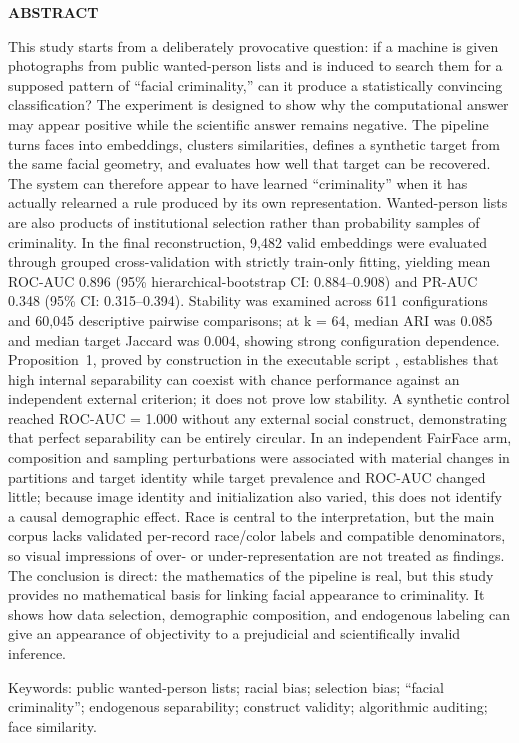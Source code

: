 \documentclass[12pt,oneside,a4paper,openany,brazil]{abntex2}
\newcommand{\frontheading}[1]{\par\noindent\textbf{#1}\par\vspace{3pt}}
\begin{document}
\begingroup\SingleSpacing\setlength{\parindent}{0pt}\fontsize{10.5}{13.2}\selectfont
\frontheading{ABSTRACT}
This study starts from a deliberately provocative question: if a machine is given photographs from public wanted-person lists and is induced to search them for a supposed pattern of ``facial criminality,'' can it produce a statistically convincing classification? The experiment is designed to show why the computational answer may appear positive while the scientific answer remains negative. The pipeline turns faces into embeddings, clusters similarities, defines a synthetic target from the same facial geometry, and evaluates how well that target can be recovered. The system can therefore appear to have learned ``criminality'' when it has actually relearned a rule produced by its own representation. Wanted-person lists are also products of institutional selection rather than probability samples of criminality. In the final reconstruction, 9,482 valid embeddings were evaluated through grouped cross-validation with strictly train-only fitting, yielding mean ROC-AUC 0.896 (95\% hierarchical-bootstrap CI: 0.884--0.908) and PR-AUC 0.348 (95\% CI: 0.315--0.394). Stability was examined across 611 configurations and 60,045 descriptive pairwise comparisons; at k = 64, median ARI was 0.085 and median target Jaccard was 0.004, showing strong configuration dependence. Proposition~1, proved by construction in the executable script , establishes that high internal separability can coexist with chance performance against an independent external criterion; it does not prove low stability. A synthetic control reached ROC-AUC = 1.000 without any external social construct, demonstrating that perfect separability can be entirely circular. In an independent FairFace arm, composition and sampling perturbations were associated with material changes in partitions and target identity while target prevalence and ROC-AUC changed little; because image identity and initialization also varied, this does not identify a causal demographic effect. Race is central to the interpretation, but the main corpus lacks validated per-record race/color labels and compatible denominators, so visual impressions of over- or under-representation are not treated as findings. The conclusion is direct: the mathematics of the pipeline is real, but this study provides no mathematical basis for linking facial appearance to criminality. It shows how data selection, demographic composition, and endogenous labeling can give an appearance of objectivity to a prejudicial and scientifically invalid inference.\par\vspace{4pt}
Keywords: public wanted-person lists; racial bias; selection bias; ``facial criminality''; endogenous separability; construct validity; algorithmic auditing; face similarity.
\endgroup
\clearpage
\end{document}

